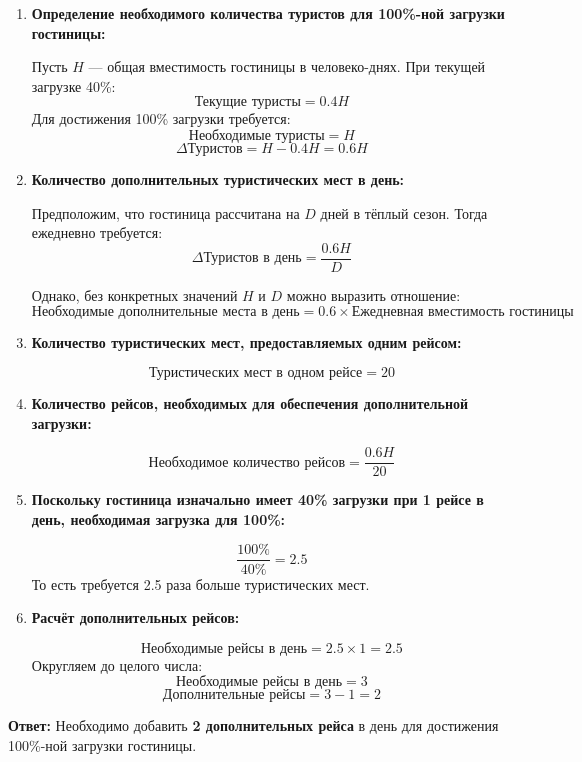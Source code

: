 \documentclass[a4paper,12pt]{article}
\begin{document}
\begin{enumerate}
    \item \textbf{Определение необходимого количества туристов для 100\%-ной загрузки гостиницы:}
    
    Пусть \( H \) — общая вместимость гостиницы в человеко-днях. При текущей загрузке 40\%:
    \[
    \text{Текущие туристы} = 0.4H
    \]
    Для достижения 100\% загрузки требуется:
    \[
    \text{Необходимые туристы} = H
    \]
    \[
    \Delta \text{Туристов} = H - 0.4H = 0.6H
    \]
    
    \item \textbf{Количество дополнительных туристических мест в день:}
    
    Предположим, что гостиница рассчитана на \( D \) дней в тёплый сезон. Тогда ежедневно требуется:
    \[
    \Delta \text{Туристов в день} = \frac{0.6H}{D}
    \]
    
    Однако, без конкретных значений \( H \) и \( D \) можно выразить отношение:
    \[
    \text{Необходимые дополнительные места в день} = 0.6 \times \text{Ежедневная вместимость гостиницы}
    \]
    
    \item \textbf{Количество туристических мест, предоставляемых одним рейсом:}
    
    \[
    \text{Туристических мест в одном рейсе} = 20
    \]
    
    \item \textbf{Количество рейсов, необходимых для обеспечения дополнительной загрузки:}
    
    \[
    \text{Необходимое количество рейсов} = \frac{0.6H}{20}
    \]
    
    \item \textbf{Поскольку гостиница изначально имеет 40\% загрузки при 1 рейсе в день, необходимая загрузка для 100\%:}
    
    \[
    \frac{100\%}{40\%} = 2.5
    \]
    То есть требуется 2.5 раза больше туристических мест.
    
    \item \textbf{Расчёт дополнительных рейсов:}
    
    \[
    \text{Необходимые рейсы в день} = 2.5 \times 1 = 2.5
    \]
    Округляем до целого числа:
    \[
    \text{Необходимые рейсы в день} = 3
    \]
    \[
    \text{Дополнительные рейсы} = 3 - 1 = 2
    \]
\end{enumerate}

\textbf{Ответ:} Необходимо добавить \textbf{2 дополнительных рейса} в день для достижения 100\%-ной загрузки гостиницы.
\end{document}
